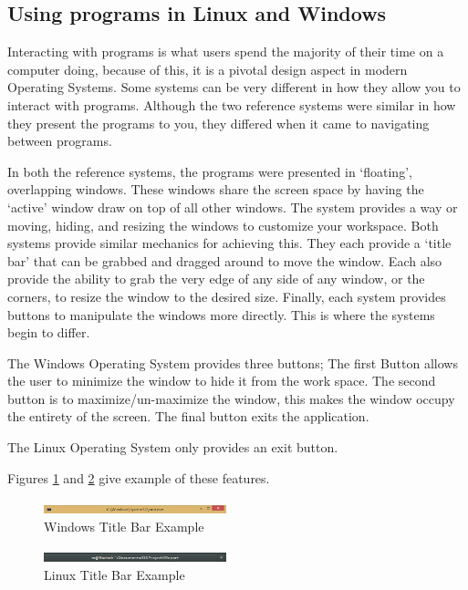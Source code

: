\documentclass[a4paper]{report}
\begin{document}
\subsection{Using programs in Linux and Windows}

Interacting with programs is what users spend the majority of their time on a computer doing, because of this, it is a pivotal design aspect in modern Operating Systems. Some systems can be very different in how they allow you to interact with programs. Although the two reference systems were similar in how they present the programs to you, they differed when it came to navigating between programs.

In both the reference systems, the programs were presented in `floating', overlapping windows. These windows share the screen space by having the `active' window draw on top of all other windows. The system provides a way or moving, hiding, and resizing the windows to customize your workspace. Both systems provide similar mechanics for achieving this. They each provide a `title bar' that can be grabbed and dragged around to move the window. Each also provide the ability to grab the very edge of any side of any window, or the corners, to resize the window to the desired size. Finally, each system provides buttons to manipulate the windows more directly. This is where the systems begin to differ.

The Windows Operating System provides three buttons; The first Button allows the user to minimize the window to hide it from the work space. The second button is to maximize/un-maximize the window, this makes the window occupy the entirety of the screen. The final button exits the application.

The Linux Operating System only provides an exit button.

Figures \ref{fig:WinTitleBarScreen} and \ref{fig:LinTitleBarScreen} give example of these features.

\begin{figure}[ht]
\centering
\includegraphics[width=200px]{images/Windows_title_bar_screenshot}
\caption{Windows Title Bar Example}
\label{fig:WinTitleBarScreen}
\end{figure}

\begin{figure}[ht]
\centering
\includegraphics[width=200px]{images/Linux_title_bar_screenshot}
\caption{Linux Title Bar Example}
\label{fig:LinTitleBarScreen}
\end{figure}
\end{document}
